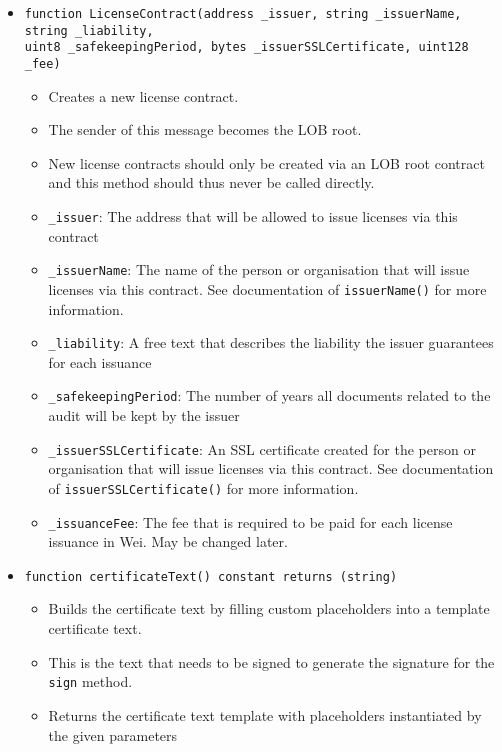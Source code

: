 \documentclass[a4paper]{article}
\begin{document}
\begin{itemize}
  \item \texttt{function LicenseContract(address \_issuer, string \_issuerName, string \_liability, \\uint8 \_safekeepingPeriod, bytes \_issuerSSLCertificate, uint128 \_fee)}
  \begin{itemize}
    \item Creates a new license contract.
    \item The sender of this message becomes the LOB root.
    \item New license contracts should only be created via an LOB root contract and this method should thus never be called directly.
    \item \texttt{\_issuer}: The address that will be allowed to issue licenses via this contract
    \item \texttt{\_issuerName}: The name of the person or organisation that will issue licenses via this contract. See documentation of \texttt{issuerName()} for more information.
    \item \texttt{\_liability}:  A free text that describes the liability the issuer guarantees for each issuance
    \item \texttt{\_safekeepingPeriod}: The number of years all documents related to the audit will be kept by the issuer
    \item \texttt{\_issuerSSLCertificate}: An SSL certificate created for the person or organisation that will issue licenses via this contract. See documentation of \texttt{issuerSSLCertificate()} for more information.
    \item \texttt{\_issuanceFee}: The fee that is required to be paid for each license issuance in Wei. May be changed later.

  \end{itemize}
  
  \item \texttt{function certificateText() constant returns (string)}
  \begin{itemize}
    \item Builds the certificate text by filling custom placeholders into a template certificate text.
    \item This is the text that needs to be signed to generate the signature for the \texttt{sign} method.
    \item Returns the certificate text template with placeholders instantiated by the given parameters
  \end{itemize}
  

\end{itemize}
\end{document}
